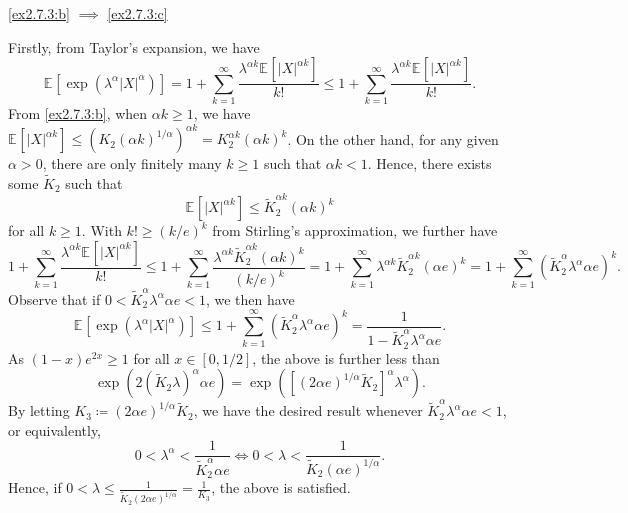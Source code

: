 \begin{answer}
	\begin{claim}
		\autoref{ex2.7.3:b} \(\implies \) \autoref{ex2.7.3:c}
	\end{claim}
	\begin{explanation}
		Firstly, from Taylor's expansion, we have
		\[
			\mathbb{E}_{}[\exp (\lambda ^\alpha \vert X \vert ^\alpha )]
			= 1 + \sum_{k=1}^{\infty} \frac{\lambda ^{\alpha k} \mathbb{E}_{}[\vert X \vert ^{\alpha k}] }{k!}
			\leq 1 + \sum_{k=1}^{\infty} \frac{\lambda ^{\alpha k} \mathbb{E}_{}[\vert X \vert ^{\alpha k}] }{k!}.
		\]
		From \autoref{ex2.7.3:b}, when \(\alpha k \geq 1\), we have \(\mathbb{E}_{}[\vert X \vert ^{\alpha k}] \leq (K_2 (\alpha k)^{1 / \alpha })^{\alpha k} = K_2^{\alpha k} (\alpha k)^k\). On the other hand, for any given \(\alpha > 0\), there are only finitely many \(k \geq 1\) such that \(\alpha k < 1\). Hence, there exists some \(\widetilde{K} _2\) such that
		\[
			\mathbb{E}_{}[\vert X \vert ^{\alpha k}]
			\leq \widetilde{K} _2^{\alpha k} (\alpha k)^k
		\]
		for all \(k \geq 1\). With \(k! \geq (k / e)^k\) from Stirling's approximation, we further have
		\[
			1 + \sum_{k=1}^{\infty} \frac{\lambda ^{\alpha k} \mathbb{E}_{}[\vert X \vert ^{\alpha k}] }{k!}
			\leq 1 + \sum_{k=1}^{\infty} \frac{\lambda ^{\alpha k} \widetilde{K} _2^{\alpha k} (\alpha k)^k }{(k / e)^k}
			= 1 + \sum_{k=1}^{\infty} \lambda ^{\alpha k} \widetilde{K} _2^{\alpha k} (\alpha e)^k
			= 1 + \sum_{k=1}^{\infty} (\widetilde{K} _2^\alpha \lambda ^\alpha \alpha e)^k.
		\]
		Observe that if \(0 < \widetilde{K} _2^\alpha \lambda ^\alpha \alpha e < 1\), we then have
		\[
			\mathbb{E}_{}[\exp (\lambda ^\alpha \vert X \vert ^\alpha )]
			\leq 1 + \sum_{k=1}^{\infty} (\widetilde{K} _2^\alpha \lambda ^\alpha \alpha e)^k
			= \frac{1}{1 - \widetilde{K} _2^\alpha \lambda ^\alpha \alpha e}.
		\]
		As \((1 - x)e^{2x} \geq 1\) for all \(x \in [0, 1 / 2]\), the above is further less than
		\[
			\exp (2 (\widetilde{K} _2 \lambda )^\alpha \alpha e)
			= \exp (\left[ (2 \alpha e)^{1 / \alpha } \widetilde{K} _2 \right] ^\alpha \lambda ^\alpha ).
		\]
		By letting \(K_3 \coloneqq (2 \alpha e)^{1 / \alpha } \widetilde{K} _2\), we have the desired result whenever \(\widetilde{K} _2^\alpha \lambda ^\alpha \alpha e < 1\), or equivalently,
		\[
			0 < \lambda ^\alpha < \frac{1}{\widetilde{K} _2^\alpha \alpha e}
			\iff 0 < \lambda < \frac{1}{\widetilde{K} _2 (\alpha e)^{1 / \alpha }}.
		\]
		Hence, if \(0 < \lambda \leq \frac{1}{\widetilde{K} _2 (2 \alpha e)^{1 / \alpha }} = \frac{1}{K_3}\), the above is satisfied.
	\end{explanation}


\end{answer}
